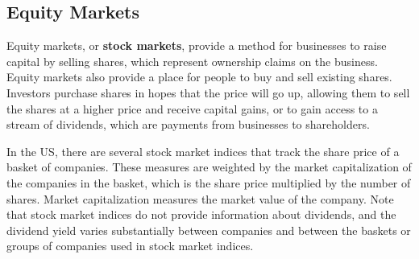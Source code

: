 \documentclass{report}
\begin{document}
{{\begin{minipage}{0.76\textwidth}
\subsection*{Equity Markets}
\small Equity markets, or \textbf{stock markets}, provide a method for businesses to raise capital by selling shares, which represent ownership claims on the business. Equity markets also provide a place for people to buy and sell existing shares. Investors purchase shares in hopes that the price will go up, allowing them to sell the shares at a higher price and receive capital gains, or to gain access to a stream of dividends, which are payments from businesses to shareholders. 

In the US, there are several stock market indices that track the share price of a basket of companies. These measures are weighted by the market capitalization of the companies in the basket, which is the share price multiplied by the number of shares. Market capitalization measures the market value of the company. Note that stock market indices do not provide information about dividends, and the dividend yield varies substantially between companies and between the baskets or groups of companies used in stock market indices.
\vspace{2mm}


\end{minipage}}}
\end{document}
